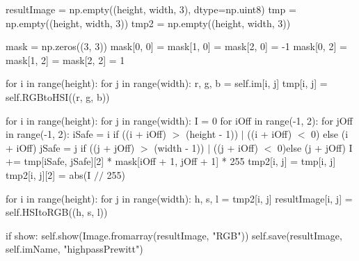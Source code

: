 \documentclass[final,a4paper,openany,12pt]{mwbk}
\begin{document}
resultImage = np.empty((height, width, 3), dtype=np.uint8) \newline
\indent tmp = np.empty((height, width, 3)) \newline
\indent tmp2 = np.empty((height, width, 3)) \newline

mask = np.zeros((3, 3)) \newline
\indent mask[0, 0] = mask[1, 0] = mask[2, 0] = -1 \newline
\indent mask[0, 2] = mask[1, 2] = mask[2, 2] = 1 \newline

for i in range(height): \newline
\indent for j in range(width): \newline
\indent r, g, b = self.im[i, j] \newline
\indent tmp[i, j] = self.RGBtoHSI((r, g, b)) \newline

for i in range(height): \newline
\indent for j in range(width): \newline
\indent I = 0 \newline
\indent for iOff in range(-1, 2): \newline
\indent for jOff in range(-1, 2): \newline
\indent iSafe = i if ((i + iOff) $>$ (height - 1)) $\mid$ ((i + iOff) $<$ 0) else (i + iOff) \newline
\indent jSafe = j if ((j + jOff) $>$ (width - 1)) $\mid$ ((j + iOff) $<$ 0)else (j + jOff) \newline
\indent I += tmp[iSafe, jSafe][2] * mask[iOff + 1, jOff + 1] * 255 \newline
\indent tmp2[i, j] = tmp[i, j] \newline
\indent tmp2[i, j][2] = abs(I $//$ 255) \newline

for i in range(height): \newline
\indent for j in range(width): \newline
\indent h, s, l = tmp2[i, j] \newline
\indent resultImage[i, j] = self.HSItoRGB((h, s, l)) \newline

if show: \newline
\indent self.show(Image.fromarray(resultImage, "RGB")) \newline
\indent self.save(resultImage, self.imName, "highpassPrewitt") \newline
\newpage
\end{document}
